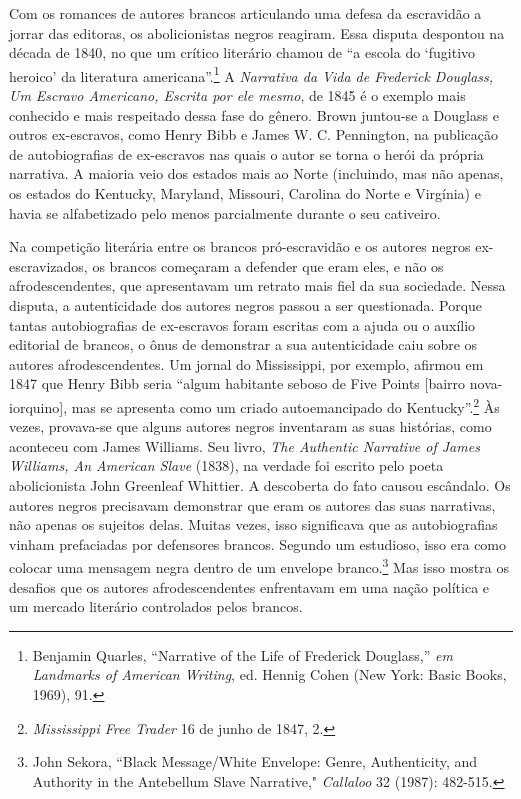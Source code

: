 Com os romances de autores brancos articulando uma defesa da escravidão
a jorrar das editoras, os abolicionistas negros reagiram. Essa disputa
despontou na década de 1840, no que um crítico literário chamou de ``a
escola do `fugitivo heroico' da literatura americana''.\footnote{Benjamin
  Quarles, ``Narrative of the Life of Frederick Douglass,'' \emph{em
  Landmarks of American Writing}, ed. Hennig Cohen (New York: Basic
  Books, 1969), 91.} A \emph{Narrativa da Vida de Frederick Douglass, Um
Escravo Americano, Escrita por ele mesmo}, de 1845 é o exemplo mais
conhecido e mais respeitado dessa fase do gênero. Brown juntou-se a
Douglass e outros ex-escravos, como Henry Bibb e James W. C. Pennington,
na publicação de autobiografias de ex-escravos nas quais o autor se
torna o herói da própria narrativa. A maioria veio dos estados mais ao
Norte (incluindo, mas não apenas, os estados do Kentucky, Maryland,
Missouri, Carolina do Norte e Virgínia) e havia se alfabetizado pelo
menos parcialmente durante o seu cativeiro.

Na competição literária entre os brancos pró-escravidão e os autores
negros ex-escravizados, os brancos começaram a defender que eram eles, e
não os afrodescendentes, que apresentavam um retrato mais fiel da sua
sociedade. Nessa disputa, a autenticidade dos autores negros passou a
ser questionada. Porque tantas autobiografias de ex-escravos foram
escritas com a ajuda ou o auxílio editorial de brancos, o ônus de
demonstrar a sua autenticidade caiu sobre os autores afrodescendentes.
Um jornal do Mississippi, por exemplo, afirmou em 1847 que Henry Bibb
seria ``algum habitante seboso de Five Points {[}bairro
nova-iorquino{]}, mas se apresenta como um criado autoemancipado do
Kentucky''.\footnote{\emph{Mississippi Free Trader} 16 de junho de 1847,
  2.} Às vezes, provava-se que alguns autores negros inventaram as suas
histórias, como aconteceu com James Williams. Seu livro, \emph{The
Authentic Narrative of James Williams, An American Slave} (1838), na
verdade foi escrito pelo poeta abolicionista John Greenleaf Whittier. A
descoberta do fato causou escândalo. Os autores negros precisavam
demonstrar que eram os autores das suas narrativas, não apenas os
sujeitos delas. Muitas vezes, isso significava que as autobiografias
vinham prefaciadas por defensores brancos. Segundo um estudioso, isso
era como colocar uma mensagem negra dentro de um envelope
branco.\footnote{John Sekora, ``Black Message/White Envelope: Genre,
  Authenticity, and Authority in the Antebellum Slave Narrative,"
  \emph{Callaloo} 32 (1987): 482-515.} Mas isso mostra os desafios que
os autores afrodescendentes enfrentavam em uma nação política e um
mercado literário controlados pelos brancos.

